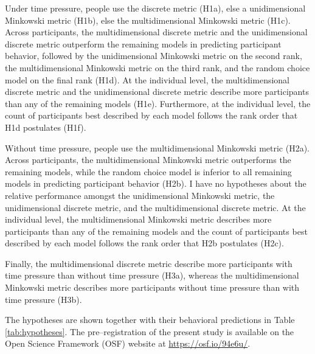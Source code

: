 \documentclass[a4paper,man,natbib]{apa6}
\begin{document}
Under time pressure, people use the discrete metric (H1a), else a unidimensional Minkowski metric (H1b), else the multidimensional Minkowski metric (H1c). Across participants, the multidimensional discrete metric and the unidimensional discrete metric outperform the remaining models in predicting participant behavior, followed by the unidimensional Minkowski metric on the second rank, the multidimensional Minkowski metric on the third rank, and the random choice model on the final rank (H1d). At the individual level, the multidimensional discrete metric and the unidimensional discrete metric describe more participants than any of the remaining models (H1e). Furthermore, at the individual level, the count of participants best described by each model follows the rank order that H1d postulates (H1f). 

Without time pressure, people use the multidimensional Minkowski metric (H2a). Across participants, the multidimensional Minkowski metric outperforms the remaining models, while the random choice model is inferior to all remaining models in predicting participant behavior (H2b). I have no hypotheses about the relative performance amongst the unidimensional Minkowski metric, the unidimensional discrete metric, and the multidimensional discrete metric. At the individual level, the multidimensional Minkowski metric describes more participants than any of the remaining models and the count of participants best described by each model follows the rank order that H2b postulates (H2c). 

Finally, the multidimensional discrete metric describe more participants with time pressure than without time pressure (H3a), whereas the multidimensional Minkowski metric describes more participants without time pressure than with time pressure (H3b).

The hypotheses are shown together with their behavioral predictions in Table \ref{tab:hypotheses}. The pre--registration of the present study is available on the Open Science Framework (OSF) website at \href{https://osf.io/94e6u/}{https://osf.io/94e6u/}.
\end{document}
